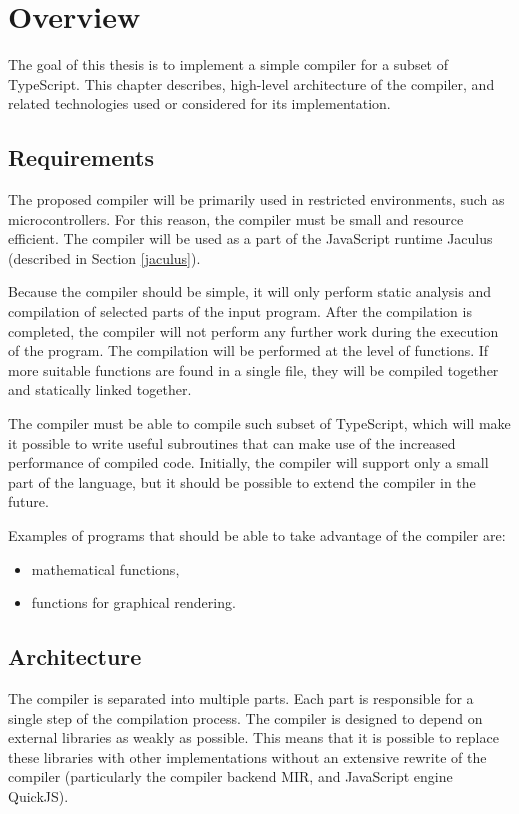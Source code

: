 \chapter{Overview}

The goal of this thesis is to implement a simple compiler for a subset of TypeScript. This chapter describes, high-level architecture of the compiler, and related technologies used or considered for its implementation.

\section{Requirements}

The proposed compiler will be primarily used in restricted environments, such as microcontrollers. For this reason, the compiler must be small and resource efficient. The compiler will be used as a part of the JavaScript runtime Jaculus (described in Section \ref{jaculus}).

Because the compiler should be simple, it will only perform static analysis and compilation of selected parts of the input program. After the compilation is completed, the compiler will not perform any further work during the execution of the program. The compilation will be performed at the level of functions. If more suitable functions are found in a single file, they will be compiled together and statically linked together.

The compiler must be able to compile such subset of TypeScript, which will make it possible to write useful subroutines that can make use of the increased performance of compiled code. Initially, the compiler will support only a small part of the language, but it should be possible to extend the compiler in the future.

Examples of programs that should be able to take advantage of the compiler are:
\begin{itemize}
    \item mathematical functions,
    \item functions for graphical rendering.
\end{itemize}

\section{Architecture}

The compiler is separated into multiple parts. Each part is responsible for a single step of the compilation process. The compiler is designed to depend on external libraries as weakly as possible. This means that it is possible to replace these libraries with other implementations without an extensive rewrite of the compiler (particularly the compiler backend MIR, and JavaScript engine QuickJS).

